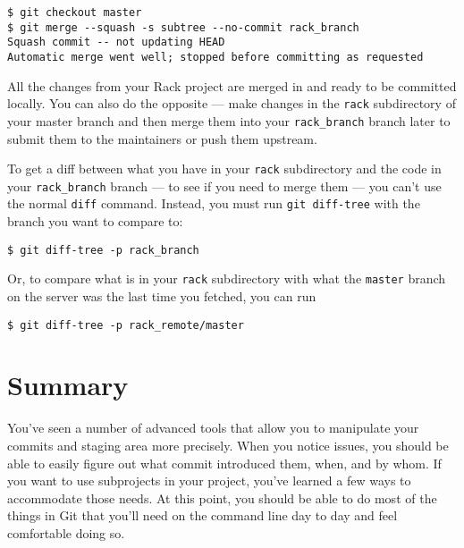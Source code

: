 \documentclass[a4paper]{book}
\newcounter{tab}[chapter]
\begin{document}
\begin{shaded}\begin{verbatim}
$ git checkout master
$ git merge --squash -s subtree --no-commit rack_branch
Squash commit -- not updating HEAD
Automatic merge went well; stopped before committing as requested
\end{verbatim}\end{shaded}

All the changes from your Rack project are merged in and ready to be committed locally. You can also do the opposite --- make changes in the \texttt{rack} subdirectory of your master branch and then merge them into your \texttt{rack\_branch} branch later to submit them to the maintainers or push them upstream.

To get a diff between what you have in your \texttt{rack} subdirectory and the code in your \texttt{rack\_branch} branch --- to see if you need to merge them --- you can't use the normal \texttt{diff} command. Instead, you must run \texttt{git diff-tree} with the branch you want to compare to:

\begin{shaded}\begin{verbatim}
$ git diff-tree -p rack_branch
\end{verbatim}\end{shaded}

Or, to compare what is in your \texttt{rack} subdirectory with what the \texttt{master} branch on the server was the last time you fetched, you can run

\begin{shaded}\begin{verbatim}
$ git diff-tree -p rack_remote/master
\end{verbatim}\end{shaded}

\section{Summary}

You've seen a number of advanced tools that allow you to manipulate your commits and staging area more precisely. When you notice issues, you should be able to easily figure out what commit introduced them, when, and by whom. If you want to use subprojects in your project, you've learned a few ways to accommodate those needs. At this point, you should be able to do most of the things in Git that you'll need on the command line day to day and feel comfortable doing so.
\end{document}
